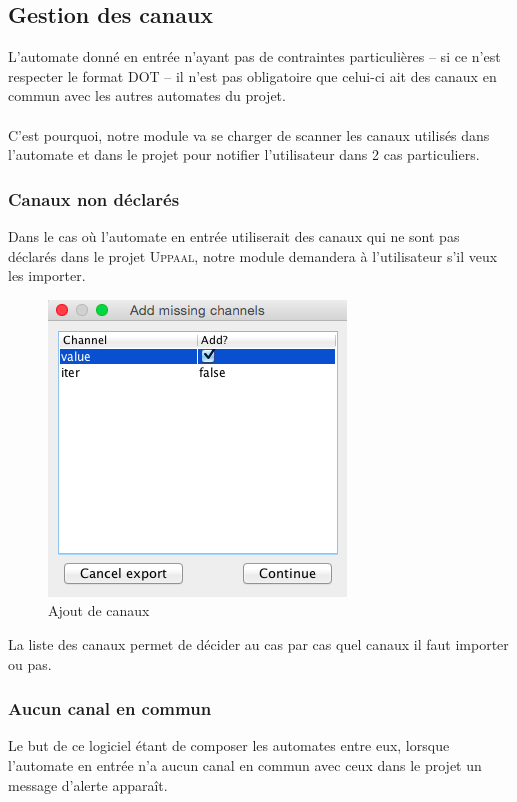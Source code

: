 \documentclass[12pt,a4paper]{report}
\begin{document}
\subsection{Gestion des canaux}

L'automate donné en entrée n'ayant pas de contraintes particulières -- si ce n'est respecter 
le format DOT -- il n'est pas obligatoire que celui-ci ait des canaux en commun avec 
les autres automates du projet.
\\\\
C'est pourquoi, notre module va se charger de scanner les canaux utilisés dans l'automate 
et dans le projet pour notifier l'utilisateur dans 2 cas particuliers.

\subsubsection*{Canaux non déclarés}

Dans le cas où l'automate en entrée utiliserait des canaux qui ne sont pas déclarés
dans le projet \textsc{Uppaal}, notre module demandera à l'utilisateur s'il veux les 
importer.

\begin{figure}[h]
  \centering
  \includegraphics[scale=0.6]{ressources/gui/channels.png}
  \caption{Ajout de canaux}
\end{figure}

La liste des canaux permet de décider au cas par cas quel canaux il faut importer ou pas.

\subsubsection*{Aucun canal en commun}
Le but de ce logiciel étant de composer les automates entre eux, lorsque l'automate en 
entrée n'a aucun canal en commun avec ceux dans le projet un message d'alerte apparaît.
\end{document}
